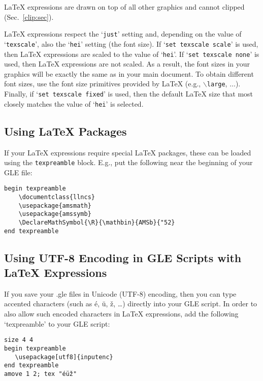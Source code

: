 \LaTeX{} expressions are drawn on top of all other graphics and cannot clipped (Sec.~\ref{clip:sec}).

\LaTeX{} expressions respect the `\texttt{just}' setting and, depending on the value of `\texttt{texscale}', also the `\texttt{hei}' setting (the font size). If `\texttt{set texscale scale}' is used, then \LaTeX{} expressions are scaled to the value of `\texttt{hei}'. If `\texttt{set texscale none}' is used, then \LaTeX{} expressions are not scaled. As a result, the font sizes in your graphics will be exactly the same as in your main document. To obtain different font sizes, use the font size primitives provided by \LaTeX{} (e.g., \texttt{$\backslash$large}, $\ldots$). Finally, if `\texttt{set texscale fixed}' is used, then the default \LaTeX{} size that most closely matches the value of `\texttt{hei}' is selected.

\subsection{Using LaTeX Packages}

If your \LaTeX{} expressions require special \LaTeX{} packages, these can be loaded using the \texttt{texpreamble} block. E.g., put the following near the beginning of your GLE file:

\begin{verbatim}
begin texpreamble
    \documentclass{llncs}
    \usepackage{amsmath}
    \usepackage{amssymb}
    \DeclareMathSymbol{\R}{\mathbin}{AMSb}{"52}
end texpreamble
\end{verbatim}

\subsection{Using UTF-8 Encoding in GLE Scripts with LaTeX Expressions}

If you save your .gle files in Unicode (UTF-8) encoding, then you can type accented characters (such as \'e, \"u, \v{z}, \ldots) directly into your GLE script. In order to also allow such encoded characters in \LaTeX{} expressions, add the following `texpreamble' to your GLE script:


\verb+size 4 4+\\
\verb+begin texpreamble+\\
\verb+   \usepackage[utf8]{inputenc}+\\
\verb+end texpreamble+\\
\texttt{amove 1 2; tex "\'e\"u\v{z}"}

